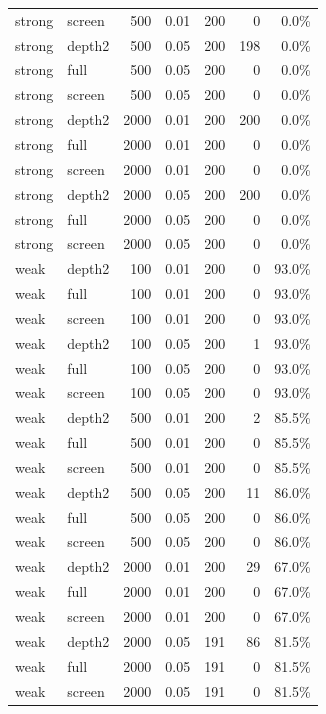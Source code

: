 \begin{longtable}{llrrrrr}
strong & screen & 500 & 0.01 & 200 & 0 & 0.0\%\\
strong & depth2 & 500 & 0.05 & 200 & 198 & 0.0\%\\
strong & full & 500 & 0.05 & 200 & 0 & 0.0\%\\
strong & screen & 500 & 0.05 & 200 & 0 & 0.0\%\\
strong & depth2 & 2000 & 0.01 & 200 & 200 & 0.0\%\\
strong & full & 2000 & 0.01 & 200 & 0 & 0.0\%\\
strong & screen & 2000 & 0.01 & 200 & 0 & 0.0\%\\
strong & depth2 & 2000 & 0.05 & 200 & 200 & 0.0\%\\
strong & full & 2000 & 0.05 & 200 & 0 & 0.0\%\\
strong & screen & 2000 & 0.05 & 200 & 0 & 0.0\%\\
weak & depth2 & 100 & 0.01 & 200 & 0 & 93.0\%\\
weak & full & 100 & 0.01 & 200 & 0 & 93.0\%\\
weak & screen & 100 & 0.01 & 200 & 0 & 93.0\%\\
weak & depth2 & 100 & 0.05 & 200 & 1 & 93.0\%\\
weak & full & 100 & 0.05 & 200 & 0 & 93.0\%\\
weak & screen & 100 & 0.05 & 200 & 0 & 93.0\%\\
weak & depth2 & 500 & 0.01 & 200 & 2 & 85.5\%\\
weak & full & 500 & 0.01 & 200 & 0 & 85.5\%\\
weak & screen & 500 & 0.01 & 200 & 0 & 85.5\%\\
weak & depth2 & 500 & 0.05 & 200 & 11 & 86.0\%\\
weak & full & 500 & 0.05 & 200 & 0 & 86.0\%\\
weak & screen & 500 & 0.05 & 200 & 0 & 86.0\%\\
weak & depth2 & 2000 & 0.01 & 200 & 29 & 67.0\%\\
weak & full & 2000 & 0.01 & 200 & 0 & 67.0\%\\
weak & screen & 2000 & 0.01 & 200 & 0 & 67.0\%\\
weak & depth2 & 2000 & 0.05 & 191 & 86 & 81.5\%\\
weak & full & 2000 & 0.05 & 191 & 0 & 81.5\%\\
weak & screen & 2000 & 0.05 & 191 & 0 & 81.5\%\\
\bottomrule\end{longtable}
